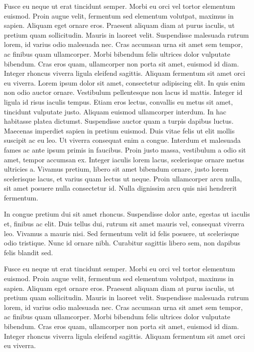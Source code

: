 \documentclass{scrartcl}
\begin{document}
Fusce eu neque ut erat tincidunt semper. Morbi eu orci vel tortor elementum euismod. Proin augue velit, fermentum sed elementum volutpat, maximus in sapien. Aliquam eget ornare eros. Praesent aliquam diam at purus iaculis, ut pretium quam sollicitudin. Mauris in laoreet velit. Suspendisse malesuada rutrum lorem, id varius odio malesuada nec. Cras accumsan urna sit amet sem tempor, ac finibus quam ullamcorper. Morbi bibendum felis ultrices dolor vulputate bibendum. Cras eros quam, ullamcorper non porta sit amet, euismod id diam. Integer rhoncus viverra ligula eleifend sagittis. Aliquam fermentum sit amet orci eu viverra.
Lorem ipsum dolor sit amet, consectetur adipiscing elit. In quis enim non odio auctor ornare. Vestibulum pellentesque non lacus id mattis. Integer id ligula id risus iaculis tempus. Etiam eros lectus, convallis eu metus sit amet, tincidunt vulputate justo. Aliquam euismod ullamcorper interdum. In hac habitasse platea dictumst. Suspendisse auctor quam a turpis dapibus luctus. Maecenas imperdiet sapien in pretium euismod. Duis vitae felis ut elit mollis suscipit ac eu leo. Ut viverra consequat enim a congue. Interdum et malesuada fames ac ante ipsum primis in faucibus. Proin justo massa, vestibulum a odio sit amet, tempor accumsan ex. Integer iaculis lorem lacus, scelerisque ornare metus ultricies a. Vivamus pretium, libero sit amet bibendum ornare, justo lorem scelerisque lacus, et varius quam lectus ut neque. Proin ullamcorper arcu nulla, sit amet posuere nulla consectetur id. Nulla dignissim arcu quis nisi hendrerit fermentum.

In congue pretium dui sit amet rhoncus. Suspendisse dolor ante, egestas ut iaculis et, finibus ac elit. Duis tellus dui, rutrum sit amet mauris vel, consequat viverra leo. Vivamus a mauris nisi. Sed fermentum velit id felis posuere, ut scelerisque odio tristique. Nunc id ornare nibh. Curabitur sagittis libero sem, non dapibus felis blandit sed.

Fusce eu neque ut erat tincidunt semper. Morbi eu orci vel tortor elementum euismod. Proin augue velit, fermentum sed elementum volutpat, maximus in sapien. Aliquam eget ornare eros. Praesent aliquam diam at purus iaculis, ut pretium quam sollicitudin. Mauris in laoreet velit. Suspendisse malesuada rutrum lorem, id varius odio malesuada nec. Cras accumsan urna sit amet sem tempor, ac finibus quam ullamcorper. Morbi bibendum felis ultrices dolor vulputate bibendum. Cras eros quam, ullamcorper non porta sit amet, euismod id diam. Integer rhoncus viverra ligula eleifend sagittis. Aliquam fermentum sit amet orci eu viverra.
\end{document}
